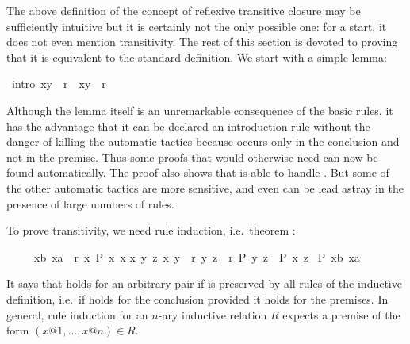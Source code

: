 \begin{isabellebody}
\begin{isamarkuptext}
The above definition of the concept of reflexive transitive closure may
be sufficiently intuitive but it is certainly not the only possible one:
for a start, it does not even mention transitivity.
The rest of this section is devoted to proving that it is equivalent to
the standard definition. We start with a simple lemma:%
\end{isamarkuptext}%
\isamarkuptrue%
\ {\isacharbrackleft}intro{\isacharbrackright}{\isacharcolon}\ {\isachardoublequote}{\isacharparenleft}x{\isacharcomma}y{\isacharparenright}\ {\isasymin}\ r\ {\isasymLongrightarrow}\ {\isacharparenleft}x{\isacharcomma}y{\isacharparenright}\ {\isasymin}\ r{\isacharasterisk}{\isachardoublequote}\isanewline
\isamarkupfalse%
\isamarkupfalse%
%
\begin{isamarkuptext}%
\noindent
Although the lemma itself is an unremarkable consequence of the basic rules,
it has the advantage that it can be declared an introduction rule without the
danger of killing the automatic tactics because  occurs only in
the conclusion and not in the premise. Thus some proofs that would otherwise
need  can now be found automatically. The proof also
shows that  is able to handle . But
some of the other automatic tactics are more sensitive, and even  can be lead astray in the presence of large numbers of rules.

To prove transitivity, we need rule induction, i.e.\ theorem
:
\begin{isabelle}%
\ \ \ \ \ {\isasymlbrakk}{\isacharparenleft}{\isacharquery}xb{\isacharcomma}\ {\isacharquery}xa{\isacharparenright}\ {\isasymin}\ {\isacharquery}r{\isacharasterisk}{\isacharsemicolon}\ {\isasymAnd}x{\isachardot}\ {\isacharquery}P\ x\ x{\isacharsemicolon}\isanewline
\isaindent{\ \ \ \ \ \ }{\isasymAnd}x\ y\ z{\isachardot}\ {\isasymlbrakk}{\isacharparenleft}x{\isacharcomma}\ y{\isacharparenright}\ {\isasymin}\ {\isacharquery}r{\isacharsemicolon}\ {\isacharparenleft}y{\isacharcomma}\ z{\isacharparenright}\ {\isasymin}\ {\isacharquery}r{\isacharasterisk}{\isacharsemicolon}\ {\isacharquery}P\ y\ z{\isasymrbrakk}\ {\isasymLongrightarrow}\ {\isacharquery}P\ x\ z{\isasymrbrakk}\isanewline
\isaindent{\ \ \ \ \ }{\isasymLongrightarrow}\ {\isacharquery}P\ {\isacharquery}xb\ {\isacharquery}xa%
\end{isabelle}
It says that  holds for an arbitrary pair  if  is preserved by all rules of the inductive definition,
i.e.\ if  holds for the conclusion provided it holds for the
premises. In general, rule induction for an $n$-ary inductive relation $R$
expects a premise of the form $(x@1,\dots,x@n) \in R$.


\end{isamarkuptext}
\end{isabellebody}
